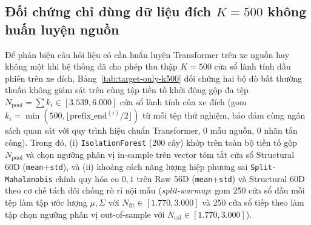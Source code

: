 \documentclass[12pt, a4paper, reqno, oneside]{book}
\DeclareRobustCommand{\code}[1]{\nolinkurl{#1}}
\begin{document}
{\subsection{Đối chứng chỉ dùng dữ liệu đích \texorpdfstring{$K=500$}{K=500} không huấn luyện nguồn}\label{subsec:target-only-k500}
Để phản biện câu hỏi liệu có cần huấn luyện Transformer trên xe nguồn hay không một khi hệ thống đã cho phép thu thập $K=500$ cửa sổ lành tính đầu phiên trên xe đích, Bảng~\ref{tab:target-only-k500} đối chứng hai bộ dò bất thường thuần không giám sát trên cùng tập tiền tố khởi động gộp đa tệp $N_{\text{pool}} = \sum k_i \in [3.539, 6.000]$ cửa sổ lành tính của xe đích (gom $k_i = \min(500, \lfloor\mathrm{prefix\_end}^{(i)}/2\rfloor)$ từ mỗi tệp thử nghiệm, bảo đảm cùng ngân sách quan sát với quy trình hiệu chuẩn Transformer, 0 mẫu nguồn, 0 nhãn tấn công). Trong đó, (i) \code{IsolationForest} (200 cây) khớp trên toàn bộ tiền tố gộp $N_{\text{pool}}$ và chọn ngưỡng phân vị in-sample trên vector tóm tắt cửa sổ Structural 60D (\code{mean}+\code{std}), và (ii) khoảng cách năng lượng hiệp phương sai \code{Split-Mahalanobis} chính quy hóa co $0{,}1$ trên Raw 56D (\code{mean}+\code{std}) và Structural 60D theo cơ chế tách đôi chống rò rỉ nội mẫu (\textit{split-warmup}: gom 250 cửa sổ đầu mỗi tệp làm tập ước lượng $\mu,\Sigma$ với $N_{\text{fit}} \in [1.770, 3.000]$ và 250 cửa sổ tiếp theo làm tập chọn ngưỡng phân vị out-of-sample với $N_{\text{cal}} \in [1.770, 3.000]$).

}
\end{document}
